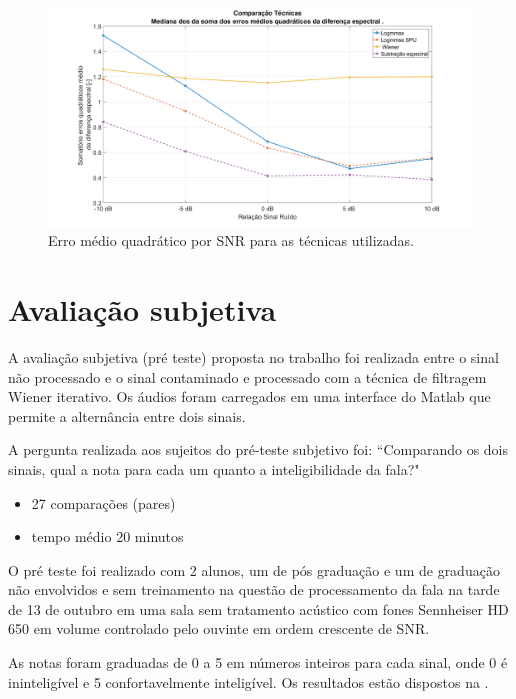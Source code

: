 \begin{figure}[H]
\centering
\includegraphics[width=14cm]{Figs/Total_total}
\caption{Erro médio quadrático por SNR para as técnicas utilizadas.}
\label{total_total}
\end{figure}



\section{Avaliação subjetiva}
A avaliação subjetiva (pré teste) proposta no trabalho foi realizada entre o sinal não processado e o sinal contaminado e processado com a técnica de filtragem Wiener iterativo. Os áudios foram carregados em uma interface do Matlab que permite a alternância entre dois sinais.

A pergunta realizada aos sujeitos do pré-teste subjetivo foi: ``Comparando os dois sinais, qual a nota para cada um quanto a inteligibilidade da fala?"
    
\begin{itemize}
        \item 27 comparações (pares)
        \item tempo médio 20 minutos
\end{itemize}

O pré teste foi realizado com 2 alunos, um de pós graduação e um de graduação não envolvidos e sem treinamento na questão de processamento da fala na tarde de 13 de outubro em uma sala sem tratamento acústico com fones Sennheiser HD 650 em volume controlado pelo ouvinte em ordem crescente de SNR.

As notas foram graduadas de 0 a 5 em números inteiros para cada sinal, onde 0 é ininteligível e 5 confortavelmente inteligível. Os resultados estão dispostos na .

